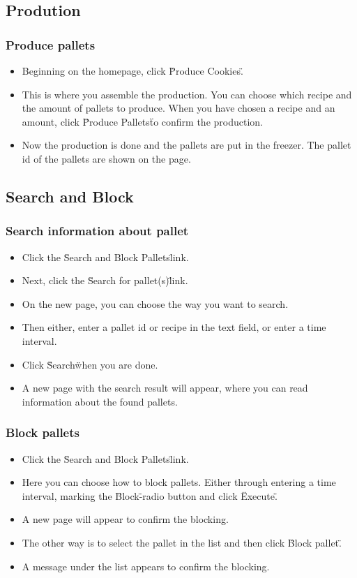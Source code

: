 \documentclass[a4paper]{article}
\begin{document}
\subsection{Prodution}
\subsubsection{Produce pallets}
\begin{itemize}
  \item Beginning on the homepage, click \"Produce Cookies\".
  \item This is where you assemble the production. You can choose which recipe and the amount of pallets to produce. When you have chosen a recipe and an amount, click \"Produce Pallets\" to confirm the production.
  \item Now the production is done and the pallets are put in the freezer. The pallet id of the pallets are shown on the page.
\end{itemize}

\subsection{Search and Block}
\subsubsection{Search information about pallet}
\begin{itemize}
	\item Click the \"Search and Block Pallets\" link.
	\item Next, click the \"Search for pallet(s)\" link.
	\item On the new page, you can choose the way you want to search.
	\item Then either, enter a pallet id or recipe in the text field, or enter a time interval.
	\item Click \"Search\" when you are done.
	\item A new page with the search result will appear, where you can read information about the found pallets.
\end{itemize}
\subsubsection{Block pallets}
\begin{itemize}
	\item Click the \"Search and Block Pallets\" link.
	\item Here you can choose how to block pallets. Either through entering a time interval, marking the \"Block\"-radio button and click \"Execute\". 
	\item A new page will appear to confirm the blocking.
	\item The other way is to select the pallet in the list and then click \"Block pallet\".
	\item A message under the list appears to confirm the blocking.
\end{itemize}
\end{document}
